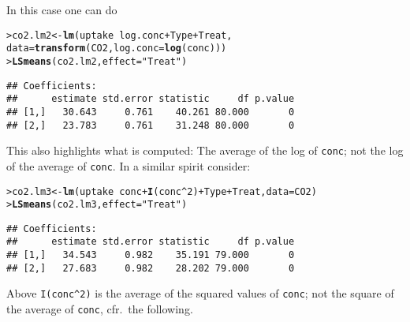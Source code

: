 \documentclass[11pt]{article}\usepackage[]{graphicx}\usepackage[]{color}
\makeatletter
\newcommand{\hlnum}[1]{\textcolor[rgb]{0.686,0.059,0.569}{#1}}%
\newcommand{\hlstr}[1]{\textcolor[rgb]{0.192,0.494,0.8}{#1}}%
\newcommand{\hlopt}[1]{\textcolor[rgb]{0,0,0}{#1}}%
\newcommand{\hlstd}[1]{\textcolor[rgb]{0.345,0.345,0.345}{#1}}%
\newcommand{\hlkwb}[1]{\textcolor[rgb]{0.69,0.353,0.396}{#1}}%
\newcommand{\hlkwc}[1]{\textcolor[rgb]{0.333,0.667,0.333}{#1}}%
\newcommand{\hlkwd}[1]{\textcolor[rgb]{0.737,0.353,0.396}{\textbf{#1}}}%
\newenvironment{kframe}{%
 \def\at@end@of@kframe{}%
 \ifinner\ifhmode%
  \def\at@end@of@kframe{\end{minipage}}%
  \begin{minipage}{\columnwidth}%
 \fi\fi%
 \def\FrameCommand##1{\hskip\@totalleftmargin \hskip-\fboxsep
 \colorbox{shadecolor}{##1}\hskip-\fboxsep
     \hskip-\linewidth \hskip-\@totalleftmargin \hskip\columnwidth}%
 \MakeFramed {\advance\hsize-\width
   \@totalleftmargin\z@ \linewidth\hsize
   \@setminipage}}%
 {\par\unskip\endMakeFramed%
 \at@end@of@kframe}
\newenvironment{knitrout}{}{} %
\def\code#1{\texttt{#1}}
\renewenvironment{knitrout}{
  \begin{oldknitrout}
    \footnotesize
    \topsep=0pt
}{
  \end{oldknitrout}
}
\makeatother
\begin{document}
In this case one can do
\begin{knitrout}
\color{fgcolor}\begin{kframe}
\begin{alltt}
\hlstd{> }\hlstd{co2.lm2} \hlkwb{<-} \hlkwd{lm}\hlstd{(uptake} \hlopt{~} \hlstd{log.conc} \hlopt{+} \hlstd{Type} \hlopt{+} \hlstd{Treat,}
\hlstd{  }             \hlkwc{data}\hlstd{=}\hlkwd{transform}\hlstd{(CO2,} \hlkwc{log.conc}\hlstd{=}\hlkwd{log}\hlstd{(conc)))}
\hlstd{> }\hlkwd{LSmeans}\hlstd{(co2.lm2,} \hlkwc{effect}\hlstd{=}\hlstr{"Treat"}\hlstd{)}
\end{alltt}
\begin{verbatim}
## Coefficients:
##      estimate std.error statistic     df p.value
## [1,]   30.643     0.761    40.261 80.000       0
## [2,]   23.783     0.761    31.248 80.000       0
\end{verbatim}
\end{kframe}
\end{knitrout}

This also highlights what is computed: The average of the log of
\code{conc}; not the log of the average of \code{conc}.
In a similar spirit consider:

\begin{knitrout}
\color{fgcolor}\begin{kframe}
\begin{alltt}
\hlstd{> }\hlstd{co2.lm3} \hlkwb{<-} \hlkwd{lm}\hlstd{(uptake} \hlopt{~} \hlstd{conc} \hlopt{+} \hlkwd{I}\hlstd{(conc}\hlopt{^}\hlnum{2}\hlstd{)} \hlopt{+} \hlstd{Type} \hlopt{+} \hlstd{Treat,} \hlkwc{data}\hlstd{=CO2)}
\hlstd{> }\hlkwd{LSmeans}\hlstd{(co2.lm3,} \hlkwc{effect}\hlstd{=}\hlstr{"Treat"}\hlstd{)}
\end{alltt}
\begin{verbatim}
## Coefficients:
##      estimate std.error statistic     df p.value
## [1,]   34.543     0.982    35.191 79.000       0
## [2,]   27.683     0.982    28.202 79.000       0
\end{verbatim}
\end{kframe}
\end{knitrout}

Above \verb'I(conc^2)' is the average of the squared values of
\code{conc}; not the  square of the average of
\code{conc}, cfr.\ the following.
\end{document}
